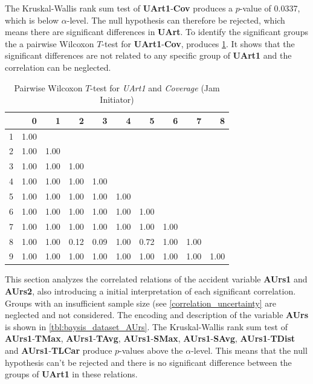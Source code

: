 The Kruskal-Wallis rank sum test of \textbf{UArt1}-\textbf{Cov} produces a $p$-value of 0.0337, which is below $\alpha$-level. The null hypothesis can therefore be rejected, which means there are significant differences in \textbf{UArt}. To identify the significant groups the a pairwise Wilcoxon $T$-test for \textbf{UArt1}-\textbf{Cov}, produces \cref*{tbl:wilcoxon_baysis_initiator_UArt_Cov}. It shows that the significant differences are not related to any specific group of \textbf{UArt1} and the correlation can be neglected.
\begin{table}[ht]
	\tiny
	\centering
    \begin{tabular}{rrrrrrrrrr}
        \toprule
        & 0 & 1 & 2 & 3 & 4 & 5 & 6 & 7 & 8 \\ 
        \midrule
        1 & 1.00 &  &  &  &  &  &  &  &  \\ 
        2 & 1.00 & 1.00 &  &  &  &  &  &  &  \\ 
        3 & 1.00 & 1.00 & 1.00 &  &  &  &  &  &  \\ 
        4 & 1.00 & 1.00 & 1.00 & 1.00 &  &  &  &  &  \\ 
        5 & 1.00 & 1.00 & 1.00 & 1.00 & 1.00 &  &  &  &  \\ 
        6 & 1.00 & 1.00 & 1.00 & 1.00 & 1.00 & 1.00 &  &  &  \\ 
        7 & 1.00 & 1.00 & 1.00 & 1.00 & 1.00 & 1.00 & 1.00 &  &  \\ 
        8 & 1.00 & 1.00 & 0.12 & 0.09 & 1.00 & 0.72 & 1.00 & 1.00 &  \\ 
        9 & 1.00 & 1.00 & 1.00 & 1.00 & 1.00 & 1.00 & 1.00 & 1.00 & 1.00 \\ 
        \bottomrule
      \end{tabular}
    \caption{Pairwise Wilcoxon $T$-test for \textit{UArt1} and \textit{Coverage} (Jam Initiator)}
    \label{tbl:wilcoxon_baysis_initiator_UArt_Cov}
\end{table}

This section analyzes the correlated relations of the accident variable \textbf{AUrs1} and \textbf{AUrs2}, also introducing a initial interpretation of each significant correlation. Groups with an insufficient sample size (see \cref{correlation_uncertainty} are neglected and not considered. The encoding and description of the variable \textbf{AUrs} is shown in \cref{tbl:baysis_dataset_AUrs}. The Kruskal-Wallis rank sum test of \textbf{AUrs1}-\textbf{TMax}, \textbf{AUrs1}-\textbf{TAvg}, \textbf{AUrs1}-\textbf{SMax}, \textbf{AUrs1}-\textbf{SAvg}, \textbf{AUrs1}-\textbf{TDist} and \textbf{AUrs1}-\textbf{TLCar} produce $p$-values above the $\alpha$-level. This means that the null hypothesis can't be rejected and there is no significant difference between the groups of \textbf{UArt1} in these relations. 


